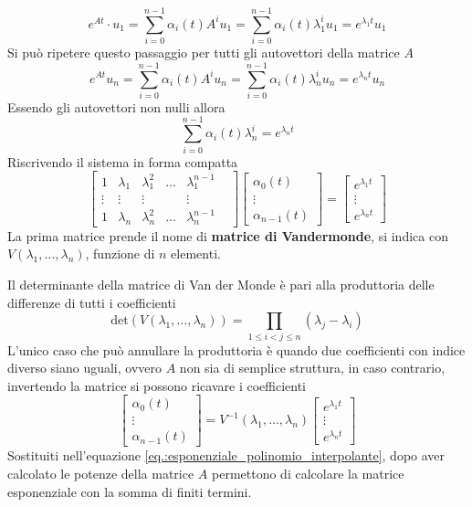 $$
e^{At} \cdot u_1 = \sum_{i=0}^{n-1} \alpha_i(t)A^iu_1 =
\sum_{i=0}^{n-1}\alpha_i(t)\lambda^i_1 u_1 = e^{\lambda_1 t} u_1
$$
Si può ripetere questo passaggio per tutti gli autovettori della matrice $A$
$$
e^{At}u_n = \sum_{i=0}^{n-1} \alpha_i(t)A^iu_n = \sum_{i=0}^{n-1}
\alpha_i(t)\lambda_n^i u_n = e^{\lambda_n t} u_n
$$
Essendo gli autovettori non nulli allora
$$
\sum_{i=0}^{n-1} \alpha_i(t) \lambda^i_n = e^{\lambda_n t}
$$
Riscrivendo il sistema in forma compatta
$$
\begin{bmatrix}
1 &\lambda_1 & \lambda_1^2 & \ldots & \lambda_1^{n-1}\\
\vdots &\vdots  &\vdots    &              & \vdots&         \\
1  &\lambda_n & \lambda_n^2 & \ldots &\lambda_n^{n-1}
\end{bmatrix}
\begin{bmatrix}
                \alpha_0(t) \\ \vdots \\ \alpha_{n-1}(t)
                \end{bmatrix} = \begin{bmatrix}
                                e^{\lambda_1 t} \\ \vdots \\ e^{\lambda_n t}
                                \end{bmatrix}
$$
La prima matrice prende il nome di \textbf{matrice di Vandermonde}, si indica
con $V(\lambda_1,\ldots,\lambda_n)$, funzione di $n$ elementi.

Il determinante della matrice di Van der Monde è pari alla produttoria delle
differenze di tutti i coefficienti
$$
\text{det}\left(V\left(\lambda_1,\ldots,\lambda_n\right)\right) = \prod_{1\leq
i < j \leq n } (\lambda_j - \lambda_i)
$$
L'unico caso che può annullare la produttoria è quando due coefficienti con
indice diverso siano uguali, ovvero $A$ non sia di semplice struttura, in caso
contrario, invertendo la matrice si possono ricavare i coefficienti
$$
\begin{bmatrix}
\alpha_0(t)\\
\vdots \\
\alpha_{n-1}(t)
\end{bmatrix} =
V^{-1}(\lambda_1,\ldots,\lambda_n)
\begin{bmatrix}
e^{\lambda_1 t}\\
\vdots \\
e^{\lambda_n t}
\end{bmatrix}
$$
Sostituiti nell'equazione \ref{eq.:esponenziale_polinomio_interpolante}, dopo
aver calcolato le potenze della matrice $A$ permettono di calcolare la matrice
esponenziale con la somma di finiti termini.

